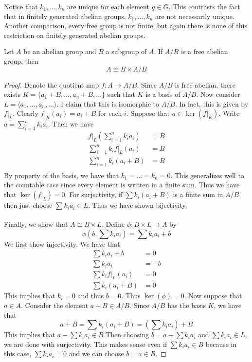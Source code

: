\documentclass[a4paper]{article}
\begin{document}
Notice that $k_1,\dots,k_n$ are unique for each element $g\in G$. This contrasts the fact that in finitely generated abelian groups, $k_1,\dots,k_n$ are not necessarily unique. \\
Another comparison, every free group is not finite, but again there is none of this restriction on finitely generated abelian groups. 

\begin{prp}{}{} Let $A$ be an abelian group and $B$ a subgroup of $A$. If $A/B$ is a free abelian group, then $$A\cong B\times A/B$$ \tcbline
\begin{proof}
Denote the quotient map $f:A\to A/B$. Since $A/B$ is free abelian, there exists $K=\{a_1+B,\dots,a_n+B,\dots\}$ such that $K$ is a basis of $A/B$. Now consider $L=\langle a_1,\dots,a_n,\dots\rangle$. I claim that this is isomorphic to $A/B$. In fact, this is given by $f|_L$. Clearly $f|_K(a_i)=a_i+B$ for each $i$. Suppose that $a\in\ker(f|_K)$. Write $a=\sum_{i=1}^nk_ia_i$. Then we have 
\begin{align*}
f|_L\left(\sum_{i=1}^nk_ia_i\right)&=B\\
\sum_{i=1}^nk_if|_L(a_i)&=B\\
\sum_{i=1}^nk_i(a_i+B)&=B\\
\end{align*}
By property of the basis, we have that $k_1=\dots=k_n=0$. This generalizes well to the countable case since every element is written in a finite sum. Thus we have that $\ker(f|_L)=0$. For surjectivity, if $\sum k_i(a_i+B)$ is a finite sum in $A/B$ then just choose $\sum k_ia_i\in L$. Thus we have shown bijectivity. \\~\\
Finally, we show that $A\cong B\times L$. Define $\phi:B\times L\to A$ by $$\phi\left(b,\sum k_ia_i\right)=\sum k_ia_i+b$$ We first show injectivity. We have that 
\begin{align*}
\sum k_ia_i+b&=0\\
\sum k_ia_i&=-b\\
\sum k_if|_L(a_i)&=0\\
\sum k_i(a_i+B)&=0
\end{align*}
This implies that $k_i=0$ and thus $b=0$. Thus $\ker(\phi)=0$. Now suppose that $a\in A$. Consider the element $a+B\in A/B$. Since $A/B$ has the basis $K$, we have that $$a+B=\sum k_i(a_i+B)=\left(\sum k_ia_i\right)+B$$ This implies that $a-\sum k_ia_i\in B$ Then choosing $b=a-\sum k_ia_i$ and $\sum k_ia_i\in L$, we are done with surjectivity. This makes sense even if $\sum k_ia_i\in B$ because in this case, $\sum k_ia_i=0$ and we can choose $b=a\in B$. 
\end{proof}
\end{prp}
\end{document}

